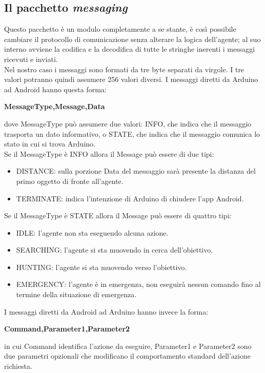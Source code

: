 \subsection{Il pacchetto \textit{messaging}}
Questo pacchetto è un modulo completamente a se stante, è così possibile cambiare il
protocollo di comunicazione senza alterare la logica dell'agente; al suo interno 
avviene la codifica e la decodifica di tutte le stringhe inerenti i messaggi ricevuti e 
inviati.
\\Nel nostro caso i messaggi sono formati da tre byte separati da virgole. I tre 
valori potranno quindi assumere 256 valori diversi.
I messaggi diretti da Arduino ad Android hanno questa forma:
\begin{center}
\textbf{MessageType,Message,Data}
\end{center}
dove MessageType può assumere due valori: INFO, che indica che il messaggio trasporta un
dato informativo, o STATE, che indica che il messaggio comunica lo stato in cui si trova Arduino.
\\Se il MessageType è INFO allora il Message può essere di due tipi: 
\begin{itemize}\item DISTANCE: sulla porzione Data del messaggio sarà presente 
la distanza del primo oggetto di fronte all'agente.
\item TERMINATE: indica l'intenzione di Arduino di chiudere l'app Android.
\end{itemize}
Se il MessageType è STATE allora il Message può essere di quattro tipi: 
\begin{itemize}
	\item IDLE: l'agente non sta eseguendo alcuna azione.
	\item SEARCHING: l'agente si sta muovendo in cerca dell'obiettivo.
	\item HUNTING: l'agente si sta muovendo verso l'obiettivo.
	\item EMERGENCY: l'agente è in emergenza, non eseguirà nessun comando fino al 
	termine della situazione di emergenza. 
\end{itemize}
I messaggi diretti da Android ad Arduino hanno invece la forma:
\begin{center}
\textbf{Command,Parameter1,Parameter2}
\end{center}
in cui Command identifica l'azione da eseguire, Parameter1 e Parameter2 sono due parametri opzionali
che modificano il comportamento standard dell'azione richiesta.

